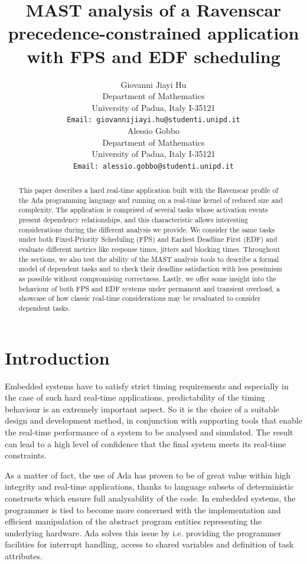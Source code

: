 \documentclass{article}
\title{MAST analysis of a Ravenscar precedence-constrained application with FPS and EDF scheduling}
\author{
  Giovanni Jiayi Hu\\
  Department of Mathematics\\
  University of Padua, Italy I-35121\\
  \texttt{Email: giovannijiayi.hu@studenti.unipd.it} \\
   \And
   Alessio Gobbo \\
   Department of Mathematics\\
   University of Padua, Italy I-35121\\
   \texttt{Email: alessio.gobbo@studenti.unipd.it} \\
}
\begin{document}
\maketitle

\begin{abstract}
This paper describes a hard real-time application built with the Ravenscar profile of the Ada programming language and running on a real-time kernel of reduced size and complexity. The application is comprised of several tasks whose activation events present dependency relationships, and this characteristic allows interesting considerations during the different analysis we provide. We consider the same tasks under both Fixed-Priority Scheduling (FPS) and Earliest Deadline First (EDF) and evaluate different metrics like response times, jitters and blocking times. Throughout the sections, we also test the ability of the MAST analysis tools to describe a formal model of dependent tasks and to check their deadline satisfaction with less pessimism as possible without compromising correctness. Lastly, we offer some insight into the behaviour of both FPS and EDF systems under permanent and transient overload, a showcase of how classic real-time considerations may be revaluated to consider dependent tasks.
\end{abstract}



\section{Introduction}

Embedded systems have to satisfy strict timing requirements and especially in the case of such hard real-time applications, predictability of the timing behaviour is an extremely important aspect. So it is the choice of a suitable design and development method, in conjunction with supporting tools that enable the real-time performance of a system to be analysed and simulated. The result can lead to a high level of confidence that the final system meets its real-time constraints.

As a matter of fact, the use of Ada has proven to be of great value within high integrity and real-time applications, thanks to language subsets of deterministic constructs which ensure full analysability of the code.  In embedded systems, the programmer is tied to become more concerned with the implementation and efficient manipulation of the abstract program entities representing the underlying hardware. Ada solves this issue by i.e. providing the programmer facilities for interrupt handling, access to shared variables and definition of task attributes.
\end{document}
